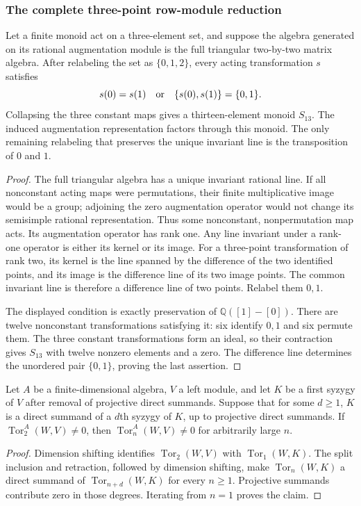 \subsubsection{The complete three-point row-module reduction}

\begin{lemma}\label{B:three-point-triangular-target}
Let a finite monoid act on a three-element set, and suppose the
algebra generated on its rational augmentation module is the full
triangular two-by-two matrix algebra.  After relabeling the set as
$\{0,1,2\}$, every acting transformation $s$ satisfies
\[
 s(0)=s(1)\quad\hbox{or}\quad\{s(0),s(1)\}=\{0,1\}.
\]
Collapsing the three constant maps gives a thirteen-element monoid
$S_{13}$.  The induced augmentation representation factors through
this monoid.  The only remaining relabeling that preserves the
unique invariant line is the transposition of $0$ and $1$.
\end{lemma}
\begin{proof}
The full triangular algebra has a unique invariant rational line.
If all nonconstant acting maps were permutations, their finite
multiplicative image would be a group; adjoining the zero
augmentation operator would not change its semisimple rational
representation.  Thus some nonconstant, nonpermutation map acts.
Its augmentation operator has rank one.  Any line invariant under
a rank-one operator is either its kernel or its image.  For a
three-point transformation of rank two, its kernel is the line
spanned by the difference of the two identified points, and its
image is the difference line of its two image points.  The common
invariant line is therefore a difference line of two points.
Relabel them $0,1$.

The displayed condition is exactly preservation of
$\mathbb Q([1]-[0])$.  There are twelve nonconstant transformations
satisfying it: six identify $0,1$ and six permute them.  The three
constant transformations form an ideal, so their contraction gives
$S_{13}$ with twelve nonzero elements and a zero.  The difference
line determines the unordered pair $\{0,1\}$, proving the last
assertion.
\end{proof}

\begin{lemma}\label{B:split-syzygy-persistence}
Let $A$ be a finite-dimensional algebra, $V$ a left module, and
let $K$ be a first syzygy of $V$ after removal of projective direct
summands.  Suppose that for some $d\geq1$, $K$ is a direct summand
of a $d$th syzygy of $K$, up to projective direct summands.
If $\operatorname{Tor}_2^A(W,V)\ne0$, then
$\operatorname{Tor}_n^A(W,V)\ne0$ for arbitrarily large $n$.
\end{lemma}
\begin{proof}
Dimension shifting identifies
$\operatorname{Tor}_2(W,V)$ with $\operatorname{Tor}_1(W,K)$.
The split inclusion and retraction, followed by dimension
shifting, make $\operatorname{Tor}_n(W,K)$ a direct summand of
$\operatorname{Tor}_{n+d}(W,K)$ for every $n\geq1$.
Projective summands contribute zero in those degrees.  Iterating
from $n=1$ proves the claim.
\end{proof}


